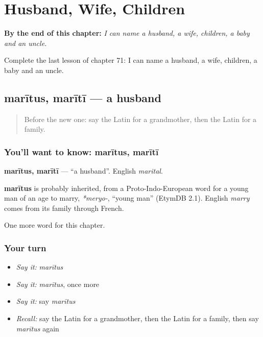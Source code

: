 
\chapter{Husband, Wife, Children}
\label{ch:la-husband-wife-children}

\begin{chapteropening}
\textbf{By the end of this chapter:} \emph{I can name a husband, a wife, children, a baby and an uncle.}

Complete the last lesson of chapter 71: I can name a husband, a wife, children, a baby and an uncle.
\end{chapteropening}

\section[marītus, marītī]{marītus, marītī — a husband}

\label{lesson:LA-C71-maritus}



\begin{quote}
Before the new one: say the Latin for a grandmother, then the Latin for a family.
\end{quote}

\subsection*{You'll want to know: marītus, marītī}
\textbf{marītus, marītī} — \textquotedblleft{}a husband\textquotedblright{}. English \emph{marital}.

\begin{cousinweb}
\textbf{marītus} is probably inherited, from a Proto-Indo-European word for a young man of an age to marry, \emph{*meryo-}, \textquotedblleft{}young man\textquotedblright{} (EtymDB 2.1). English \emph{marry} comes from its family through French.
\end{cousinweb}

\begin{grammarlens}[title={What you've built}]
One more word for this chapter.
\end{grammarlens}

\subsection*{Your turn}
\begin{itemize}
\raggedright
  \item \emph{Say it:} \emph{marītus}
  \item \emph{Say it:} \emph{marītus}, once more
  \item \emph{Say it:} say \emph{marītus}
  \item \emph{Recall:} say the Latin for a grandmother, then the Latin for a family, then say \emph{marītus} again
\end{itemize}

